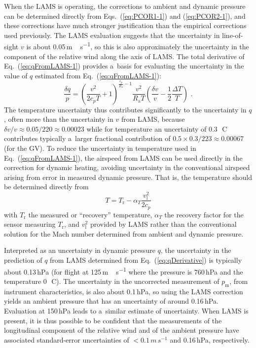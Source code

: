 \documentclass[amtd, online, hvmath]{copernicus}
\begin{document}
When the LAMS is operating, the corrections to ambient and dynamic
pressure can be determined directly from Eqs.~(\ref{eq:PCOR1-1}) and
(\ref{eq:PCOR2-1}), and these corrections have much stronger
justification than the empirical corrections used previously. The LAMS
evaluation \citep{SpulerEtAl2011} suggests that the uncertainty in
line-of-sight $v$ is about 0.05\,\unit{m\,s^{-1}}, so this is also
approximately the uncertainty in the component of the relative wind
along the axis of LAMS. The total derivative of
Eq.~(\ref{eq:qFromLAMS-1}) provides a~basis for evaluating the
uncertainty in the value of $q$ estimated from
Eq.~(\ref{eq:qFromLAMS-1}):
\begin{equation}
\frac{\delta q}{p}=\left(\frac{v^2}{2c_pT}+1\right)^{\frac{c_p}{R_{\mathrm{a}}}-1}\frac{v^2}{R_{\mathrm{a}}T}\left(\frac{\delta v}{v}-\frac{1}{2}\frac{\Delta T}{T}\right)\,\,.\label{eq:qDerivative}
\end{equation}
The temperature uncertainty thus contributes significantly to the
uncertainty in $q$, often more than the uncertainty in $v$ from LAMS,
because $\delta v/v\approx 0.05/220 \approx 0.00023$ while for
temperature an uncertainty of 0.3\,\unit{{\degree}C} contributes
typically a~larger fractional contribution of $0.5\times 0.3/223
\approx 0.00067$ (for the GV). To reduce the uncertainty in
temperature used in Eq.~(\ref{eq:qFromLAMS-1}), the airspeed from LAMS
can be used directly in the correction for dynamic heating, avoiding
uncertainty in the conventional airspeed arising from error in
measured dynamic pressure. That is, the temperature should be
determined directly from
\begin{equation}
T=T_{\mathrm{r}}-\alpha_T\frac{v_{\mathrm{l}}^2}{2c_p}\label{eq:dynHeatingcorrUsingLAMS}
\end{equation}
with $T_{\mathrm{r}}$ the measured or ``recovery'' temperature,
$\alpha_T$ the recovery factor for the sensor measuring
$T_{\mathrm{r}}$, and $v_{\mathrm{l}}^2$ provided by LAMS rather than
the conventional solution for the Mach number determined from ambient
and dynamic pressure.

Interpreted as an uncertainty in dynamic pressure $q$, the uncertainty
in the prediction of $q$ from LAMS determined from
Eq.~(\ref{eq:qDerivative}) is typically about 0.13\,hPa (for flight at
125\,\unit{m\,s^{-1}} where the pressure is 760\,hPa and the
temperature 0\,\unit{{\degree}C}).  The uncertainty in the uncorrected
measurement of $p_{\mathrm{m}}$, from instrument characteristics, is
also about 0.1\,hPa, so using the LAMS correction yields an ambient
pressure that has an uncertainty of around 0.16\,hPa.  Evaluation at
150\,\unit{hPa} leads to a~similar estimate of uncertainty.  When LAMS
is present, it is thus possible to be confident that the measurements
of the longitudinal component of the relative wind and of the ambient
pressure have associated standard-error uncertainties of
$<0.1\,\unit{m\,s^{-1}}$ and 0.16\,hPa, respectively.
\end{document}
